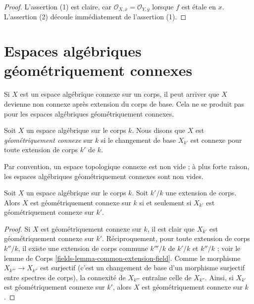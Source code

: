 \begin{proof}
L'assertion (1) est claire, car
$\mathcal{O}_{X, \overline{x}} = \mathcal{O}_{Y, \overline{y}}$
lorsque $f$ est \'etale en $x$.
L'assertion (2) découle immédiatement de l'assertion (1).
\end{proof}






\section{Espaces algébriques géométriquement connexes}
\label{section-geometrically-connected}

\noindent
Si $X$ est un espace algébrique connexe sur un corps, il peut arriver que
$X$ devienne non connexe après extension du corps de base. Cela ne se
produit pas pour les espaces algébriques géométriquement connexes.

\begin{definition}
\label{definition-geometrically-connected}
Soit $X$ un espace algébrique sur le corps $k$. Nous disons que $X$ est
{\it géométriquement connexe} sur $k$ si le changement de base $X_{k'}$
est connexe pour toute extension de corps $k'$ de $k$.
\end{definition}

\noindent
Par convention, un espace topologique connexe est non vide ; à plus forte raison,
les espaces algébriques géométriquement connexes sont non vides.

\begin{lemma}
\label{lemma-geometrically-connected-check-after-extension}
Soit $X$ un espace algébrique sur le corps $k$.
Soit $k'/k$ une extension de corps.
Alors $X$ est géométriquement connexe sur $k$ si et seulement si
$X_{k'}$ est géométriquement connexe sur $k'$.
\end{lemma}

\begin{proof}
Si $X$ est géométriquement connexe sur $k$, il est clair que
$X_{k'}$ est géométriquement connexe sur $k'$. Réciproquement,
pour toute extension de corps $k''/k$, il existe une extension de corps commune
$k'''/k$ de $k'/k$ et $k''/k$ ; voir le
lemme de Corps \ref{fields-lemma-common-extension-field}. Comme le
morphisme $X_{k'''} \to X_{k''}$ est surjectif (c'est un changement de base
d'un morphisme surjectif entre spectres de corps), la
connexité de $X_{k'''}$ entraîne celle de $X_{k''}$.
Ainsi, si $X_{k'}$ est géométriquement connexe sur $k'$, alors
$X$ est géométriquement connexe sur $k$.
\end{proof}


